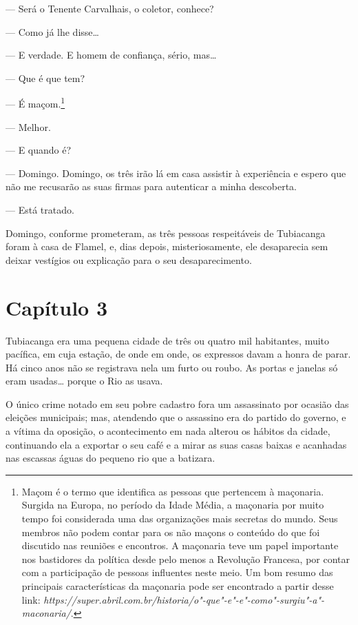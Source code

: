 --- Será o Tenente Carvalhais, o coletor, conhece?

--- Como já lhe disse\ldots{}

--- E verdade. E homem de confiança, sério, mas\ldots{}

--- Que é que tem?

--- É maçom.\footnote{Maçom é o termo que identifica as pessoas que
  pertencem à maçonaria. Surgida na Europa, no período da Idade Média, a
  maçonaria por muito tempo foi considerada uma das organizações mais
  secretas do mundo. Seus membros não podem contar para os não maçons o
  conteúdo do que foi discutido nas reuniões e encontros. A maçonaria
  teve um papel importante nos bastidores da política desde pelo menos a
  Revolução Francesa, por contar com a participação de pessoas
  influentes neste meio. Um bom resumo das principais características da
  maçonaria pode ser encontrado a partir desse link:
  \emph{https://super.abril.com.br/historia/o"-que"-e"-e"-como"-surgiu"-a"-maconaria/}.}

--- Melhor.

--- E quando é?

--- Domingo. Domingo, os três irão lá em casa assistir à experiência e
espero que não me recusarão as suas firmas para autenticar a minha
descoberta.

--- Está tratado.

Domingo, conforme prometeram, as três pessoas respeitáveis de Tubiacanga
foram à casa de Flamel, e, dias depois, misteriosamente, ele desaparecia
sem deixar vestígios ou explicação para o seu desaparecimento.

\section{Capítulo 3}

Tubiacanga era uma pequena cidade de três ou quatro mil habitantes,
muito pacífica, em cuja estação, de onde em onde, os expressos davam a
honra de parar. Há cinco anos não se registrava nela um furto ou roubo.
As portas e janelas só eram usadas\ldots{} porque o Rio as usava.

O único crime notado em seu pobre cadastro fora um assassinato por
ocasião das eleições municipais; mas, atendendo que o assassino era do
partido do governo, e a vítima da oposição, o acontecimento em nada
alterou os hábitos da cidade, continuando ela a exportar o seu café e a
mirar as suas casas baixas e acanhadas nas escassas águas do pequeno rio
que a batizara.

